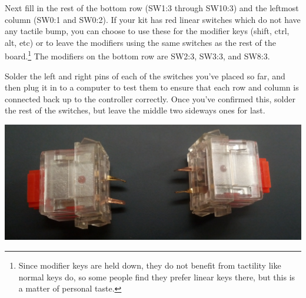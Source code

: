 \documentclass[landscape,twocolumn]{article}
\begin{document}
Next fill in the rest of the bottom row (SW1:3 through SW10:3) and the
leftmost column (SW0:1 and SW0:2). If your kit has red linear switches
which do not have any tactile bump, you can choose to use these for
the modifier keys (shift, ctrl, alt, etc) or to leave the modifiers
using the same switches as the rest of the board.\footnote{Since
  modifier keys are held down, they do not benefit from tactility like
  normal keys do, so some people find they prefer linear keys there,
  but this is a matter of personal taste.} The modifiers on the bottom
row are SW2:3, SW3:3, and SW8:3.

\vspace{1em}

Solder the left and right pins of each of the switches you've placed
so far, and then plug it in to a computer to test them to ensure that
each row and column is connected back up to the controller
correctly. Once you've confirmed this, solder the rest of the
switches, but leave the middle two sideways ones for last.

\vspace{1em}
\begin{center}
  \includegraphics[width=0.9\columnwidth]{center-switches.jpg}
\end{center}
\vspace{1em}


\end{document}
